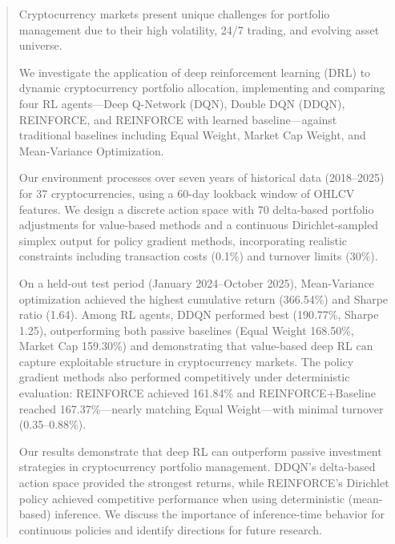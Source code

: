 
\begin{abstract}

Cryptocurrency markets present unique challenges for portfolio management due to their high volatility, 24/7 trading, and evolving asset universe.

We investigate the application of deep reinforcement learning (DRL) to dynamic cryptocurrency portfolio allocation, implementing and comparing four RL agents---Deep Q-Network (DQN), Double DQN (DDQN), REINFORCE, and REINFORCE with learned baseline---against traditional baselines including Equal Weight, Market Cap Weight, and Mean-Variance Optimization.

Our environment processes over seven years of historical data (2018--2025) for 37 cryptocurrencies, using a 60-day lookback window of OHLCV features. We design a discrete action space with 70 delta-based portfolio adjustments for value-based methods and a continuous Dirichlet-sampled simplex output for policy gradient methods, incorporating realistic constraints including transaction costs (0.1\%) and turnover limits (30\%).

On a held-out test period (January 2024--October 2025), Mean-Variance optimization achieved the highest cumulative return (366.54\%) and Sharpe ratio (1.64). Among RL agents, DDQN performed best (190.77\%, Sharpe 1.25), outperforming both passive baselines (Equal Weight 168.50\%, Market Cap 159.30\%) and demonstrating that value-based deep RL can capture exploitable structure in cryptocurrency markets. The policy gradient methods also performed competitively under deterministic evaluation: REINFORCE achieved 161.84\% and REINFORCE+Baseline reached 167.37\%---nearly matching Equal Weight---with minimal turnover (0.35--0.88\%).

Our results demonstrate that deep RL can outperform passive investment strategies in cryptocurrency portfolio management. DDQN's delta-based action space provided the strongest returns, while REINFORCE's Dirichlet policy achieved competitive performance when using deterministic (mean-based) inference. We discuss the importance of inference-time behavior for continuous policies and identify directions for future research.

\end{abstract}

